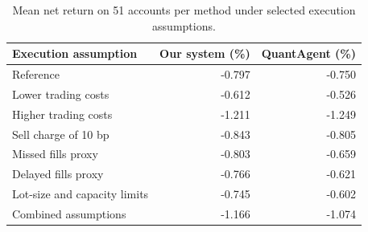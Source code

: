 \begin{table}[H]
\centering\small
\renewcommand{\arraystretch}{1.13}
\caption{Mean net return on 51 accounts per method under selected execution assumptions.}
\label{tab:execution}
\begin{tabular}{@{}lrr@{}}
\toprule
Execution assumption & Our system (\%) & QuantAgent (\%)\\
\midrule
Reference & -0.797 & -0.750\\
Lower trading costs & -0.612 & -0.526\\
Higher trading costs & -1.211 & -1.249\\
Sell charge of 10 bp & -0.843 & -0.805\\
Missed fills proxy & -0.803 & -0.659\\
Delayed fills proxy & -0.766 & -0.621\\
Lot-size and capacity limits & -0.745 & -0.602\\
Combined assumptions & -1.166 & -1.074\\
\bottomrule
\end{tabular}
\end{table}
